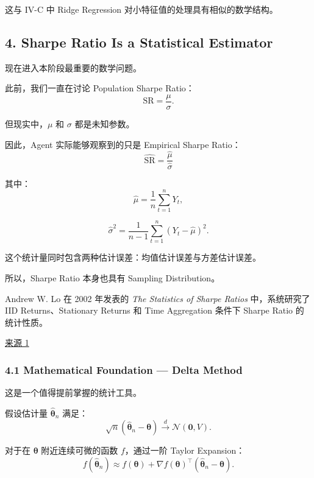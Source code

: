 这与 IV-C 中 Ridge Regression 对小特征值的处理具有相似的数学结构。

\hypertarget{part-4-67-0001-sharpe-ratio-is-a-statistical-estimator}{%
\subsection{4. Sharpe Ratio Is a Statistical Estimator}\label{part-4-67-0001-sharpe-ratio-is-a-statistical-estimator}}

现在进入本阶段最重要的数学问题。

此前，我们一直在讨论 Population Sharpe Ratio：
\[\mathrm{SR}=\frac{\mu}{\sigma}.\]

但现实中，\(\mu\) 和 \(\sigma\) 都是未知参数。

因此，Agent 实际能够观察到的只是 Empirical Sharpe Ratio：
\[\boxed{
\widehat{\mathrm{SR}}
=
\frac{\hat\mu}{\hat\sigma}
}\]

其中：
\[\hat\mu=\frac1n\sum_{t=1}^{n}Y_t,\]

\[\hat\sigma^2
=
\frac1{n-1}
\sum_{t=1}^{n}(Y_t-\hat\mu)^2.\]

这个统计量同时包含两种估计误差：均值估计误差与方差估计误差。

所以，Sharpe Ratio 本身也具有 Sampling Distribution。

Andrew W. Lo 在 2002 年发表的 \emph{The Statistics of Sharpe Ratios} 中，系统研究了 IID Returns、Stationary Returns 和 Time Aggregation 条件下 Sharpe Ratio 的统计性质。

\href{https://rpc.cfainstitute.org/research/financial-analysts-journal/2002/the-statistics-of-sharpe-ratios}{来源 1}

\hypertarget{part-4-67-0001-mathematical-foundation-delta-method}{%
\subsubsection{4.1 Mathematical Foundation --- Delta Method}\label{part-4-67-0001-mathematical-foundation-delta-method}}

这是一个值得提前掌握的统计工具。

假设估计量 \(\hat{\boldsymbol\theta}_n\) 满足：
\[\sqrt n
(\hat{\boldsymbol\theta}_n-\boldsymbol\theta)
\xrightarrow{d}
\mathcal N(\boldsymbol 0,V).\]

对于在 \(\boldsymbol\theta\) 附近连续可微的函数 \(f\)，通过一阶 Taylor Expansion：
\[f(\hat{\boldsymbol\theta}_n)
\approx
f(\boldsymbol\theta)
+
\nabla f(\boldsymbol\theta)^\top
(\hat{\boldsymbol\theta}_n-\boldsymbol\theta).\]

